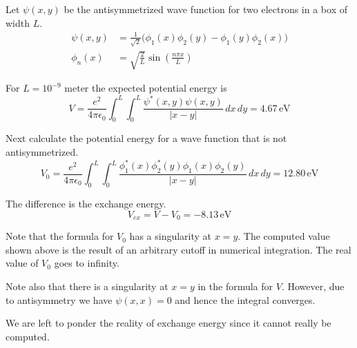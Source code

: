 \documentclass[12pt]{article}
\begin{document}
\noindent
Let $\psi(x,y)$ be the antisymmetrized wave function for two electrons in a box of width $L$.
\begin{align*}
\psi(x,y)&=\frac{1}{\sqrt{2}}
\big(\phi_1(x)\phi_2(y)-\phi_1(y)\phi_2(x)\big)
\\[2ex]
\phi_n(x)&=\sqrt{\frac{2}{L}}\sin\left(\frac{n\pi x}{L}\right)
\end{align*}

\noindent
For $L=10^{-9}$ meter the expected potential energy is
\begin{equation*}
V=\frac{e^2}{4\pi\epsilon_0}\int_0^L\int_0^L\frac{\psi^*(x,y)\psi(x,y)}{|x-y|}\,dx\,dy
=4.67\,\text{eV}
\end{equation*}

\noindent
Next calculate the potential energy for a wave function that is not antisymmetrized.
\begin{equation*}
V_0=\frac{e^2}{4\pi\epsilon_0}
\int_0^L\int_0^L\frac{\phi_1^*(x)\phi_2^*(y)\phi_1(x)\phi_2(y)}{|x-y|}\,dx\,dy
=12.80\,\text{eV}
\end{equation*}

\noindent
The difference is the exchange energy.
\begin{equation*}
V_{ex}=V-V_0=-8.13\,\text{eV}
\end{equation*}

\noindent
Note that the formula for $V_0$ has a singularity at $x=y$.
The computed value shown above is the result of an arbitrary cutoff in numerical integration.
The real value of $V_0$ goes to infinity.

\bigskip
\noindent
Note also that there is a singularity at $x=y$ in the formula for $V$.
However, due to antisymmetry we have $\psi(x,x)=0$ and hence the integral converges.

\bigskip
\noindent
We are left to ponder the reality of exchange energy since it cannot really be computed.
\end{document}

